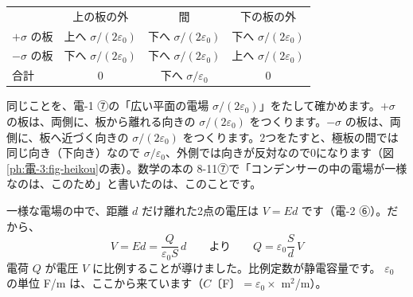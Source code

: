 \begin{bkfigure}
\par\smallskip
{\small\begin{tabular}{@{}l@{\quad}c@{\quad}c@{\quad}c@{}}
 & 上の板の外 & 間 & 下の板の外\\
$+\sigma$ の板 & 上へ $\sigma/(2\varepsilon_0)$ & 下へ $\sigma/(2\varepsilon_0)$ & 下へ $\sigma/(2\varepsilon_0)$\\
$-\sigma$ の板 & 下へ $\sigma/(2\varepsilon_0)$ & 下へ $\sigma/(2\varepsilon_0)$ & 上へ $\sigma/(2\varepsilon_0)$\\
合計 & 0 & 下へ $\sigma/\varepsilon_0$ & 0
\end{tabular}}
\label{ph:電-3:fig-heikou}
\end{bkfigure}

同じことを、電-1 ⑦の「広い平面の電場 $\sigma/(2\varepsilon_0)$」をたして確かめます。$+\sigma$ の板は、両側に、板から離れる向きの $\sigma/(2\varepsilon_0)$ をつくります。$-\sigma$ の板は、両側に、板へ近づく向きの $\sigma/(2\varepsilon_0)$ をつくります。2つをたすと、極板の間では同じ向き（下向き）なので $\sigma/\varepsilon_0$、外側では向きが反対なので0になります（図\ref{ph:電-3:fig-heikou}の表）。数学の本の 8-11⑦で「コンデンサーの中の電場が一様なのは、このため」と書いたのは、このことです。

一様な電場の中で、距離 $d$ だけ離れた2点の電圧は $V=Ed$ です（電-2 ⑥）。だから、
\[V=Ed=\frac{Q}{\varepsilon_0S}\,d\qquad\text{より}\qquad Q=\varepsilon_0\frac{S}{d}\,V\]
電荷 $Q$ が電圧 $V$ に比例することが導けました。比例定数が静電容量です。
\label{ph:電-3:heikouban}$\varepsilon_0$ の単位 F/m は、ここから来ています（$C$〔F〕$=\varepsilon_0\times$ m$^2$/m）。

